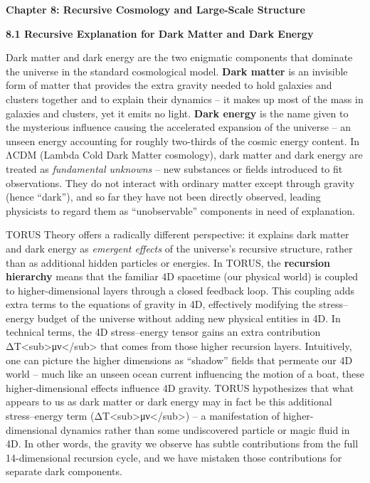 \documentclass[]{article}
\date{}
\begin{document}
\textbf{Chapter 8: Recursive Cosmology and Large-Scale Structure}

\textbf{8.1 Recursive Explanation for Dark Matter and Dark Energy}

Dark matter and dark energy are the two enigmatic components that
dominate the universe in the standard cosmological model. \textbf{Dark
matter} is an invisible form of matter that provides the extra gravity
needed to hold galaxies and clusters together and to explain their
dynamics -- it makes up most of the mass in galaxies and clusters, yet
it emits no light​. \textbf{Dark energy} is the name given to the
mysterious influence causing the accelerated expansion of the universe
-- an unseen energy accounting for roughly two-thirds of the cosmic
energy content. In ΛCDM (Lambda Cold Dark Matter cosmology), dark matter
and dark energy are treated as \emph{fundamental unknowns} -- new
substances or fields introduced to fit observations. They do not
interact with ordinary matter except through gravity (hence ``dark''),
and so far they have not been directly observed, leading physicists to
regard them as ``unobservable'' components in need of explanation.

TORUS Theory offers a radically different perspective: it explains dark
matter and dark energy as \emph{emergent effects} of the universe's
recursive structure, rather than as additional hidden particles or
energies. In TORUS, the \textbf{recursion hierarchy} means that the
familiar 4D spacetime (our physical world) is coupled to
higher-dimensional layers through a closed feedback loop. This coupling
adds extra terms to the equations of gravity in 4D, effectively
modifying the stress--energy budget of the universe without adding new
physical entities in 4D. In technical terms, the 4D stress--energy
tensor gains an extra contribution
ΔT\textless{}sub\textgreater{}μν\textless{}/sub\textgreater{} that comes
from those higher recursion layers​. Intuitively, one can picture the
higher dimensions as ``shadow'' fields that permeate our 4D world --
much like an unseen ocean current influencing the motion of a boat,
these higher-dimensional effects influence 4D gravity. TORUS
hypothesizes that what appears to us as dark matter or dark energy may
in fact be this additional stress--energy term
(ΔT\textless{}sub\textgreater{}μν\textless{}/sub\textgreater{}) -- a
manifestation of higher-dimensional dynamics rather than some
undiscovered particle or magic fluid in 4D​. In other words, the gravity
we observe has subtle contributions from the full 14-dimensional
recursion cycle, and we have mistaken those contributions for separate
dark components.
\end{document}
